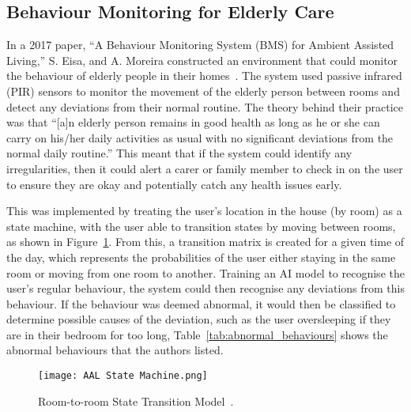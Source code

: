 \subsection{Behaviour Monitoring for Elderly Care}
In a 2017 paper, ``A Behaviour Monitoring System (BMS) for Ambient Assisted Living,'' S. Eisa, and A. Moreira constructed an environment that could monitor the behaviour of elderly people in their homes~\cite{Eisa17}.
The system used passive infrared (PIR) sensors to monitor the movement of the elderly person between rooms and detect any deviations from their normal routine.
The theory behind their practice was that ``[a]n elderly person remains in good health as long as he or she can carry on his/her daily activities as usual with no significant deviations from the normal daily routine.''
This meant that if the system could identify any irregularities, then it could alert a carer or family member to check in on the user to ensure they are okay and potentially catch any health issues early.

This was implemented by treating the user's location in the house (by room) as a state machine, with the user able to transition states by moving between rooms, as shown in Figure~\ref{fig:state_machine}.
From this, a transition matrix is created for a given time of the day, which represents the probabilities of the user either staying in the same room or moving from one room to another.
Training an AI model to recognise the user's regular behaviour, the system could then recognise any deviations from this behaviour.
If the behaviour was deemed abnormal, it would then be classified to determine possible causes of the deviation, such as the user oversleeping if they are in their bedroom for too long, Table~\ref{tab:abnormal_behaviours} shows the abnormal behaviours that the authors listed.

\begin{figure}[!htb]
    \caption{Room-to-room State Transition Model~\protect\cite{Eisa17}.}
    \centering
    \texttt{[image: AAL State Machine.png]}
    \label{fig:state_machine}
\end{figure}

